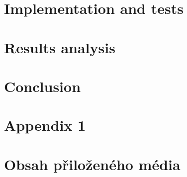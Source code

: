 \documentclass[english,master,unicode]{ctufit-thesis}
\theoremstyle{plain}
\theoremstyle{definition}
\theoremstyle{remark}
\numberwithin{theorem}{chapter}
\begin{document}

\chapter{Implementation and tests}

\chapter{Results analysis}

\chapter{Conclusion}


\appendix\appendixinit
\chapter{Appendix 1}


\backmatter
\printbibliography


\chapter{Obsah přiloženého média}
\end{document}
